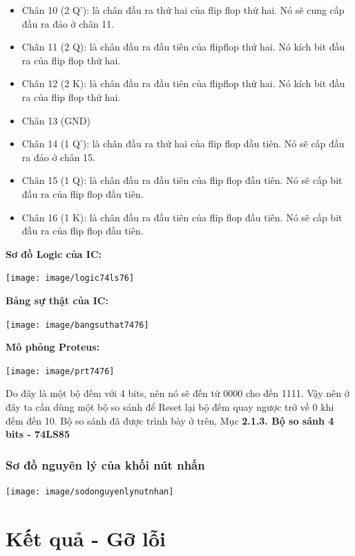 \documentclass[10pt,a4paper]{report}
\begin{document}
\begin{itemize}
	\item Chân 10 (2 Q'): là chân đầu ra thứ hai của flip flop thứ hai. Nó sẽ cung cấp đầu ra đảo ở chân 11.
	\item Chân 11 (2 Q): là chân đầu ra đầu tiên của flipflop thứ hai. Nó kích bit đầu ra của flip flop thứ hai.
	\item Chân 12 (2 K): là chân đầu ra đầu tiên của flipflop thứ hai. Nó kích bit đầu ra của flip flop thứ hai.
	\item Chân 13 (GND)
	\item Chân 14 (1 Q'): là chân đầu ra thứ hai của flip flop đầu tiên. Nó sẽ cấp đầu ra đảo ở chân 15.
	\item Chân 15 (1 Q): là chân đầu ra đầu tiên của flip flop đầu tiên. Nó sẽ cấp bit đầu ra của flip flop đầu tiên.
	\item Chân 16 (1 K): là chân đầu ra đầu tiên của flip flop đầu tiên. Nó sẽ cấp bit đầu ra của flip flop đầu tiên.
\end{itemize}

\textbf{Sơ đồ Logic của IC: }
\begin{center}
	\texttt{[image: image/logic74ls76]}
\end{center}

\textbf{Bảng sự thật của IC: }
\begin{center}
	\texttt{[image: image/bangsuthat7476]}
\end{center}
 \textbf{Mô phỏng Proteus: }

\begin{center}
	 	\texttt{[image: image/prt7476]}
\end{center}

Do đây là một bộ đếm với 4 bits, nên nó sẽ đến từ 0000 cho đến 1111. Vậy nên ở đây ta cần dùng một bộ so sánh để Reset lại bộ đếm quay ngược trở về 0 khi đếm đến 10. Bộ so sánh đã được trình bày ở trên, Mục \textbf{2.1.3. Bộ so sánh 4 bits - 74LS85}

\subsection{Sơ đồ nguyên lý của khối nút nhấn} 
\begin{center}
	\texttt{[image: image/sodonguyenlynutnhan]}
\end{center}


\newpage
\chapter{Kết quả - Gỡ lỗi}
\end{document}
